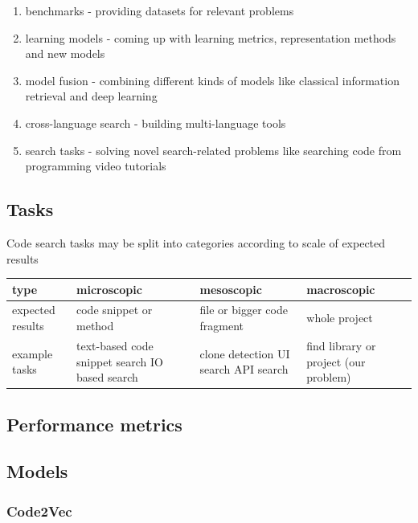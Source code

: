 \documentclass[11pt]{report}
\begin{document}
\begin{enumerate}
\label{codesearch}
    \item benchmarks - providing datasets for relevant problems
    \item learning models - coming up with learning metrics, representation methods and new models
    \item model fusion - combining different kinds of models like classical information retrieval and deep learning 
    \item cross-language search - building multi-language tools
    \item search tasks - solving novel search-related problems like searching code from programming video tutorials
\end{enumerate}


\subsection{Tasks}

Code search tasks may be split into categories according to scale of expected results

\begin{center}
\begin{tabular}{|p{2cm}|p{4cm}|p{3cm}|p{4cm}|}
\hline
type & microscopic  & mesoscopic & macroscopic\\
\hline
expected results & code snippet or method & file or bigger code fragment & whole project\\
\hline
example tasks & text-based code snippet search \newline IO based search & clone detection \newline  UI search \newline API search  & find library or project (our problem) \\
\hline
\end{tabular}
\end{center}

\subsection{Performance metrics}

\subsection{Models}

\subsubsection{Code2Vec}
\end{document}

